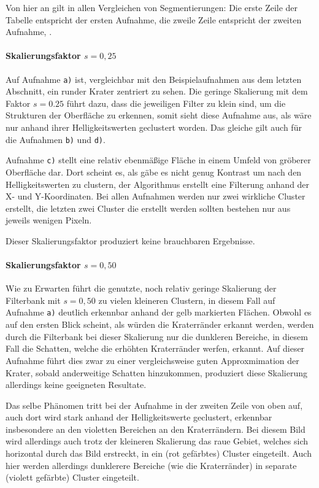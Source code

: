 Von hier an gilt in allen Vergleichen von Segmentierungen: Die erste Zeile der Tabelle entspricht der ersten Aufnahme, die zweile Zeile entspricht der zweiten Aufnahme, \etc.

\paragraph{Skalierungsfaktor $s=0,25$}

Auf Aufnahme \texttt{a)} ist, vergleichbar mit den Beispielaufnahmen aus dem letzten Abschnitt, ein runder Krater zentriert zu sehen. Die geringe Skalierung mit dem Faktor $s=0.25$ führt dazu, dass die jeweiligen Filter zu klein sind, um die Strukturen der Oberfläche zu erkennen, somit sieht diese Aufnahme aus, als wäre nur anhand ihrer Helligkeitswerten geclustert worden. Das gleiche gilt auch für die Aufnahmen \texttt{b)} und \texttt{d)}.

Aufnahme \texttt{c)} stellt eine relativ ebenmäßige Fläche in einem Umfeld von gröberer Oberfläche dar. Dort scheint es, als gäbe es nicht genug Kontrast um nach den Helligkeitswerten zu clustern, der Algorithmus erstellt eine Filterung anhand der X- und Y-Koordinaten. Bei allen Aufnahmen werden nur zwei wirkliche Cluster erstellt, die letzten zwei Cluster die erstellt werden sollten bestehen nur aus jeweils wenigen Pixeln.

Dieser Skalierungsfaktor produziert keine brauchbaren Ergebnisse.

\paragraph{Skalierungsfaktor $s=0,50$}

Wie zu Erwarten führt die genutzte, noch relativ geringe Skalierung der Filterbank mit $s=0,50$ zu vielen kleineren Clustern, in diesem Fall auf Aufnahme \texttt{a)} deutlich erkennbar anhand der gelb markierten Flächen. Obwohl es auf den ersten Blick scheint, als würden die Kraterränder erkannt werden, werden durch die Filterbank bei dieser Skalierung nur die dunkleren Bereiche, in diesem Fall die Schatten, welche die erhöhten Kraterränder werfen, erkannt. Auf dieser Aufnahme führt dies zwar zu einer vergleichsweise guten Approxmimation der Krater, sobald anderweitige Schatten hinzukommen, produziert diese Skalierung allerdings keine geeigneten Resultate.

Das selbe Phänomen tritt bei der Aufnahme in der zweiten Zeile von oben auf, auch dort wird stark anhand der Helligkeitswerte geclustert, erkennbar insbesondere an den violetten Bereichen an den Kraterrändern. Bei diesem Bild wird allerdings auch trotz der kleineren Skalierung das raue Gebiet, welches sich horizontal durch das Bild erstreckt, in ein (rot gefärbtes) Cluster eingeteilt. Auch hier werden allerdings dunklerere Bereiche (wie die Kraterränder) in separate (violett gefärbte) Cluster eingeteilt.

